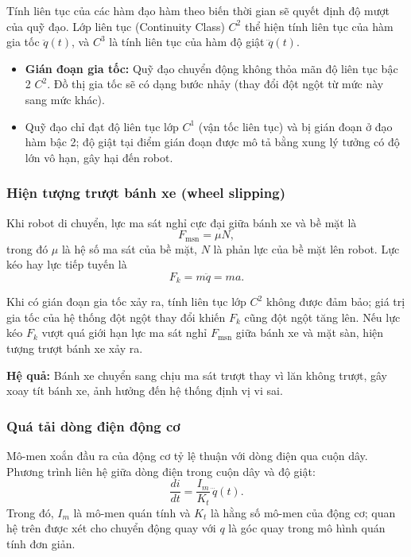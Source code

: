 \documentclass[12pt,a4paper,oneside]{report}
\begin{document}
Tính liên tục của các hàm đạo hàm theo biến thời gian sẽ quyết định độ mượt của quỹ đạo. Lớp liên tục (Continuity Class) \(C^{2}\) thể hiện tính liên tục của hàm gia tốc \(\ddot{q}(t)\), và \(C^{3}\) là tính liên tục của hàm độ giật \(\dddot{q}(t)\).

\begin{itemize}
  \item \textbf{Gián đoạn gia tốc:} Quỹ đạo chuyển động không thỏa mãn độ liên tục bậc 2 \(C^{2}\). Đồ thị gia tốc sẽ có dạng bước nhảy (thay đổi đột ngột từ mức này sang mức khác).
  \item Quỹ đạo chỉ đạt độ liên tục lớp \(C^{1}\) (vận tốc liên tục) và bị gián đoạn ở đạo hàm bậc 2; độ giật tại điểm gián đoạn được mô tả bằng xung lý tưởng có độ lớn vô hạn, gây hại đến robot.
\end{itemize}

\subsubsection{Hiện tượng trượt bánh xe (wheel slipping)}

Khi robot di chuyển, lực ma sát nghỉ cực đại giữa bánh xe và bề mặt là
\[
  F_{\mathrm{msn}}=\mu N,
\]
trong đó \(\mu\) là hệ số ma sát của bề mặt, \(N\) là phản lực của bề mặt lên robot. Lực kéo hay lực tiếp tuyến là
\[
  F_k=m\ddot{q}=ma.
\]

Khi có gián đoạn gia tốc xảy ra, tính liên tục lớp \(C^{2}\) không được đảm bảo; giá trị gia tốc của hệ thống đột ngột thay đổi khiến \(F_k\) cũng đột ngột tăng lên. Nếu lực kéo \(F_k\) vượt quá giới hạn lực ma sát nghỉ \(F_{\mathrm{msn}}\) giữa bánh xe và mặt sàn, hiện tượng trượt bánh xe xảy ra.

\textbf{Hệ quả:} Bánh xe chuyển sang chịu ma sát trượt thay vì lăn không trượt, gây xoay tít bánh xe, ảnh hưởng đến hệ thống định vị vi sai.

\subsubsection{Quá tải dòng điện động cơ}

Mô-men xoắn đầu ra của động cơ tỷ lệ thuận với dòng điện qua cuộn dây. Phương trình liên hệ giữa dòng điện trong cuộn dây và độ giật:
\[
  \frac{di}{dt}=\frac{I_m}{K_t}\,\dddot{q}(t).
\]
Trong đó, \(I_m\) là mô-men quán tính và \(K_t\) là hằng số mô-men của động cơ; quan hệ trên được xét cho chuyển động quay với \(q\) là góc quay trong mô hình quán tính đơn giản.
\end{document}
